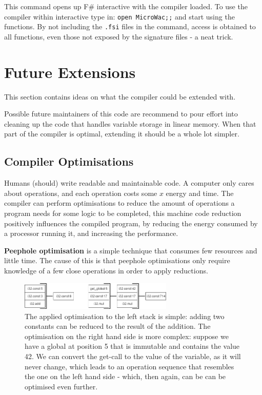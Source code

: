 \documentclass[a4paper]{article}
\begin{document}
This command opens up F\# interactive with the compiler loaded. To use the compiler within interactive type in: \texttt{open MicroWac;;} and start using the functions. By not including the \texttt{.fsi} files in the command, access is obtained to all functions, even those not exposed by the signature files - a neat trick.

\section{Future Extensions}
\label{sec:extensions}
This section contains ideas on what the compiler could be extended with.

Possible future maintainers of this code are recommend to pour effort into cleaning up the code that handles variable storage in linear memory. When that part of the compiler is optimal, extending it should be a whole lot simpler.

\subsection{Compiler Optimisations}
\label{sec:extensions:optimisations}
Humans (should) write readable and maintainable code. A computer only cares about operations, and each operation costs some $x$ energy and time. The compiler can perform optimisations to reduce the amount of operations a program needs for some logic to be completed, this machine code reduction positively influences the compiled program, by reducing the energy consumed by a processor running it, and increasing the performance.

\textbf{Peephole optimisation} is a simple technique that consumes few resources and little time. The cause of this is that peephole optimisations only require knowledge of a few close operations in order to apply reductions.

\begin{figure}[H]
	\includegraphics[width=0.65\textwidth]{PeepholeOptimisationIllustrations}
	\centering
	\caption{The applied optimisation to the left stack is simple: adding two constants can be reduced to the result of the addition. The optimisation on the right hand side is more complex: suppose we have a global at position 5 that is immutable and contains the value 42. We can convert the get-call to the value of the variable, as it will never change, which leads to an operation sequence that resembles the one on the left hand side - which, then again, can be can be optimised even further.}
\end{figure}
\end{document}
